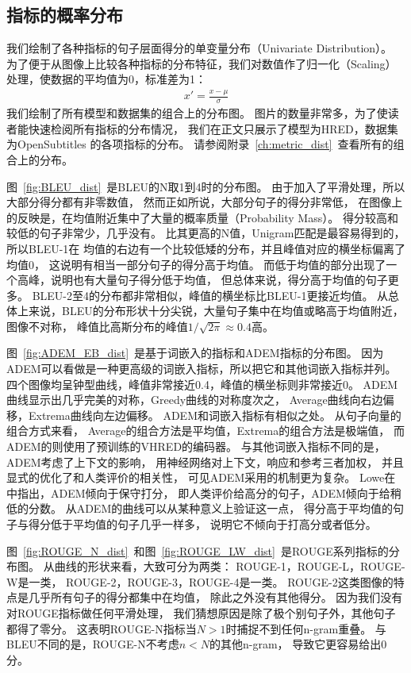 \subsection{指标的概率分布}\label{subsec:metric_distribution}
我们绘制了各种指标的句子层面得分的单变量分布（Univariate Distribution）。
为了便于从图像上比较各种指标的分布特征，我们对数值作了归一化（Scaling）处理，使数据的平均值为0，标准差为1：
\begin{align}
    x' = \frac{x - \mu}{\sigma}
\end{align}
我们绘制了所有模型和数据集的组合上的分布图。
图片的数量非常多，为了使读者能快速检阅所有指标的分布情况，
我们在正文只展示了模型为HRED，数据集为OpenSubtitles
的各项指标的分布。
请参阅附录~\ref{ch:metric_dist}~查看所有的组合上的分布。


图~\ref{fig:BLEU_dist}~是BLEU的N取1到4时的分布图。
由于加入了平滑处理，所以大部分得分都有非零数值，
然而正如\cite{HowNot}所说，大部分句子的得分非常低，
在图像上的反映是，在均值附近集中了大量的概率质量（Probability Mass）。
得分较高和较低的句子非常少，几乎没有。
比其更高的N值，Unigram匹配是最容易得到的，所以BLEU-1在
均值的右边有一个比较低矮的分布，并且峰值对应的横坐标偏离了均值0，
这说明有相当一部分句子的得分高于均值。
而低于均值的部分出现了一个高峰，说明也有大量句子得分低于均值，
但总体来说，得分高于均值的句子更多。
BLEU-2至4的分布都非常相似，峰值的横坐标比BLEU-1更接近均值。
从总体上来说，BLEU的分布形状十分尖锐，大量句子集中在均值或略高于均值附近，
图像不对称， 峰值比高斯分布的峰值$1 / \sqrt{2 \pi} \approx 0.4$高。


图~\ref{fig:ADEM_EB_dist}~是基于词嵌入的指标和ADEM指标的分布图。
因为ADEM可以看做是一种更高级的词嵌入指标，所以把它和其他词嵌入指标并列。
四个图像均呈钟型曲线，峰值非常接近0.4，峰值的横坐标则非常接近0。
ADEM曲线显示出几乎完美的对称，Greedy曲线的对称度次之，
Average曲线向右边偏移，Extrema曲线向左边偏移。
ADEM和词嵌入指标有相似之处。
从句子向量的组合方式来看，
Average的组合方法是平均值，Extrema的组合方法是极端值，
而ADEM的则使用了预训练的VHRED的编码器。
与其他词嵌入指标不同的是，ADEM考虑了上下文的影响，
用神经网络对上下文，响应和参考三者加权，
并且显式的优化了和人类评价的相关性，
可见ADEM采用的机制更为复杂。
Lowe在\cite{ADEM}中指出，ADEM倾向于保守打分，
即人类评价给高分的句子，ADEM倾向于给稍低的分数。
从ADEM的曲线可以从某种意义上验证这一点，
得分高于平均值的句子与得分低于平均值的句子几乎一样多，
说明它不倾向于打高分或者低分。


图~\ref{fig:ROUGE_N_dist}~和图~\ref{fig:ROUGE_LW_dist}~是ROUGE系列指标的分布图。
从曲线的形状来看，大致可分为两类：
ROUGE-1，ROUGE-L，ROUGE-W是一类，
ROUGE-2，ROUGE-3，ROUGE-4是一类。
ROUGE-2这类图像的特点是几乎所有句子的得分都集中在均值，
除此之外没有其他得分。
因为我们没有对ROUGE指标做任何平滑处理，
我们猜想原因是除了极个别句子外，其他句子都得了零分。
这表明ROUGE-N指标当$N > 1$时捕捉不到任何n-gram重叠。
与BLEU不同的是，ROUGE-N不考虑$n < N$的其他n-gram，
导致它更容易给出0分。

